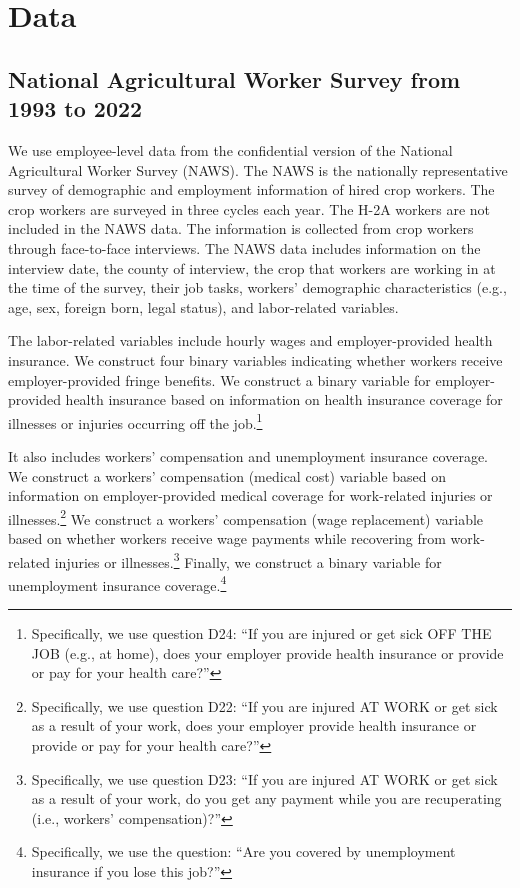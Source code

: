 \documentclass[12pt]{article}
\begin{document}
\clearpage
\section{Data}
\subsection{National Agricultural Worker Survey from 1993 to 2022}
We use employee-level data from the confidential version of the National Agricultural Worker Survey (NAWS). The NAWS is the nationally representative survey of demographic and employment information of hired crop workers. The crop workers are surveyed in three cycles each year. The H-2A workers are not included in the NAWS data. The information is collected from crop workers through face-to-face interviews. The NAWS data includes information on the interview date, the county of interview, the crop that workers are working in at the time of the survey, their job tasks, workers' demographic characteristics (e.g., age, sex, foreign born, legal status), and labor-related variables.  

The labor-related variables include hourly wages and employer-provided health insurance. We construct four binary variables indicating whether workers receive employer-provided fringe benefits. We construct a binary variable for employer-provided health insurance based on information on health insurance coverage for illnesses or injuries occurring off the job.\footnote{Specifically, we use question D24: “If you are injured or get sick OFF THE JOB (e.g., at home), does your employer provide health insurance or provide or pay for your health care?”} 

It also includes workers’ compensation and unemployment insurance coverage. We construct a workers’ compensation (medical cost) variable based on information on employer-provided medical coverage for work-related injuries or illnesses.\footnote{Specifically, we use question D22: “If you are injured AT WORK or get sick as a result of your work, does your employer provide health insurance or provide or pay for your health care?”} We construct a workers’ compensation (wage replacement) variable based on whether workers receive wage payments while recovering from work-related injuries or illnesses.\footnote{Specifically, we use question D23: “If you are injured AT WORK or get sick as a result of your work, do you get any payment while you are recuperating (i.e., workers’ compensation)?”} Finally, we construct a binary variable for unemployment insurance coverage.\footnote{Specifically, we use the question: “Are you covered by unemployment insurance if you lose this job?”}
\end{document}
